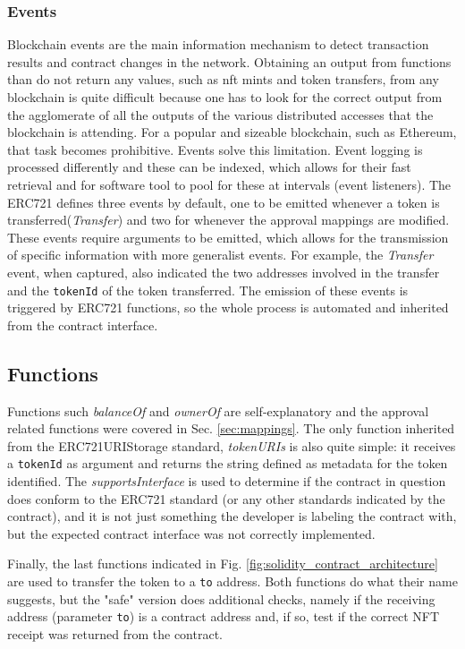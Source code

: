 \documentclass[../main.tex]{subfiles}
\begin{document}
\subsubsection{Events}
Blockchain events are the main information mechanism to detect transaction results and contract changes in the network. Obtaining an output from functions than do not return any values, such as nft mints and token transfers, from any blockchain is quite difficult because one has to look for the correct output from the agglomerate of all the outputs of the various distributed accesses that the blockchain is attending. For a popular and sizeable blockchain, such as Ethereum, that task becomes prohibitive. Events solve this limitation. Event logging is processed differently and these can be indexed, which allows for their fast retrieval and for software tool to pool for these at intervals (event listeners). The ERC721 defines three events by default, one to be emitted whenever a token is transferred(\textit{Transfer}) and two for whenever the approval mappings are modified. These events require arguments to be emitted, which allows for the transmission of specific information with more generalist events. For example, the \textit{Transfer} event, when captured, also indicated the two addresses involved in the transfer and the \verb|tokenId| of the token transferred. The emission of these events is triggered by ERC721 functions, so the whole process is automated and inherited from the contract interface.

\subsection{Functions}
Functions such \textit{balanceOf} and \textit{ownerOf} are self-explanatory and the approval related functions were covered in Sec. \ref{sec:mappings}. The only function inherited from the ERC721URIStorage standard, \textit{tokenURIs} is also quite simple: it receives a \verb|tokenId| as argument and returns the string defined as metadata for the token identified. The \textit{supportsInterface} is used to determine if the contract in question does conform to the ERC721 standard (or any other standards indicated by the contract), and it is not just something the developer is labeling the contract with, but the expected contract interface was not correctly implemented.
\par
Finally, the last functions indicated in Fig. \ref{fig:solidity_contract_architecture} are used to transfer the token to a \verb|to| address. Both functions do what their name suggests, but the "safe" version does additional checks, namely if the receiving address (parameter \verb|to|) is a contract address and, if so, test if the correct NFT receipt was returned from the contract.

\end{document}
